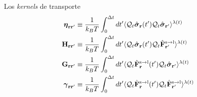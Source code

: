 \documentclass{beamer}
\begin{document}
\begin{frame}{Los \textit{kernels} de transporte}
\begin{align}
  \boldsymbol{\eta}_{{\bf  r}{\bf r}'} &\equiv
\frac{1}{k_BT}\int_0^{\Delta t} dt'\langle 
{\cal Q}_t\hat{\boldsymbol{\sigma}}_{{\bf r}}(t')
{\cal Q}_t\hat{\boldsymbol{\sigma}}_{{\bf r}'}\rangle^{\lambda(t)}
\nonumber \\
{\bf H}_{{\bf r}{\bf r}'}&\equiv\frac{1}{k_BT}\int_0^{\Delta t} dt'
\langle {\cal Q}_t\hat{\boldsymbol{\sigma}}_{{\bf r}}(t')
{\cal Q}_t\hat{\bf F}^{\rm s\to l}_{{\bf r}'}\rangle^{\lambda(t)}
\nonumber\\
{\bf G}_{{\bf r}{\bf r}'}&\equiv\frac{1}{k_BT}\int_0^{\Delta t} dt'
\langle {\cal Q}_t\hat{\bf F}^{\rm s\to l}_{{\bf r}}(t')
{\cal Q}_t\hat{\boldsymbol{\sigma}}_{{\bf r}'}\rangle^{\lambda(t)}
\nonumber\\
\boldsymbol{\gamma}_{{\bf  r}{\bf r}'}&\equiv\frac{1}{k_BT}\int_0^{\Delta t} dt'
\langle 
{\cal Q}_t\hat{\bf F}^{\rm s\to l}_{{\bf r}}(t')
{\cal Q}_t\hat{\bf F}^{\rm s\to l}_{{\bf r}'}\rangle^{\lambda(t)}
\nonumber
\end{align}
\end{frame}

\end{document}
